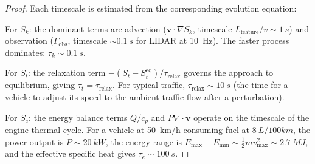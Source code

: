 \documentclass[twocolumn,10pt]{article}
\newcommand{\Sk}{S_k}
\newcommand{\St}{S_t}
\newcommand{\Se}{S_e}
\newcommand{\vmax}{v_{\mathrm{max}}}
\newcommand{\trelax}{\tau_{\mathrm{relax}}}
\newcommand{\Emax}{E_{\mathrm{max}}}
\newcommand{\Emin}{E_{\mathrm{min}}}
\begin{document}
\begin{proof}
Each timescale is estimated from the corresponding evolution equation:

For $\Sk$: the dominant terms are advection ($\mathbf{v} \cdot \nabla \Sk$, timescale $L_{\mathrm{feature}}/v \sim \SI{1}{s}$) and observation ($\Gamma_{\mathrm{obs}}$, timescale $\sim \SI{0.1}{s}$ for LIDAR at \SI{10}{Hz}). The faster process dominates: $\tau_k \sim \SI{0.1}{s}$.

For $\St$: the relaxation term $-(\St - \St^{\mathrm{eq}})/\trelax$ governs the approach to equilibrium, giving $\tau_t = \trelax$. For typical traffic, $\trelax \sim \SI{10}{s}$ (the time for a vehicle to adjust its speed to the ambient traffic flow after a perturbation).

For $\Se$: the energy balance terms $Q/c_p$ and $P\nabla \cdot \mathbf{v}$ operate on the timescale of the engine thermal cycle. For a vehicle at \SI{50}{km/h} consuming fuel at $\SI{8}{L/100km}$, the power output is $P \sim \SI{20}{kW}$, the energy range is $\Emax - \Emin \sim \frac{1}{2}m\vmax^2 \sim \SI{2.7}{MJ}$, and the effective specific heat gives $\tau_e \sim \SI{100}{s}$.
\end{proof}
\end{document}
